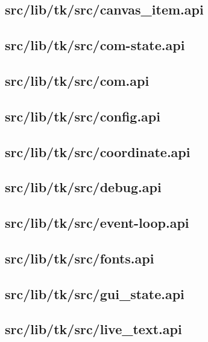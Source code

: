 \subsection{src/lib/tk/src/canvas\_item.api}


\subsection{src/lib/tk/src/com-state.api}


\subsection{src/lib/tk/src/com.api}


\subsection{src/lib/tk/src/config.api}


\subsection{src/lib/tk/src/coordinate.api}


\subsection{src/lib/tk/src/debug.api}


\subsection{src/lib/tk/src/event-loop.api}


\subsection{src/lib/tk/src/fonts.api}


\subsection{src/lib/tk/src/gui\_state.api}


\subsection{src/lib/tk/src/live\_text.api}



